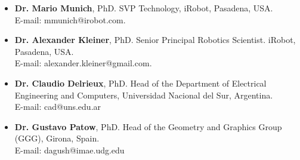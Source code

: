 \documentclass[a4paper,12pt]{article}
\begin{document}
\begin{itemize}
	\item {\bf Dr. Mario Munich}, PhD. SVP Technology, iRobot, Pasadena, USA.\\E-mail: mmunich@irobot.com. \\
	\item {\bf Dr. Alexander Kleiner}, PhD. Senior Principal Robotics Scientist. iRobot, Pasadena, USA.\\E-mail: alexander.kleiner@gmail.com. \\
	\item {\bf Dr. Claudio Delrieux}, PhD. Head of the Department of Electrical Engineering and Computers, Universidad Nacional del Sur, Argentina.\\E-mail: cad@uns.edu.ar\\
	\item {\bf Dr. Gustavo Patow}, PhD. Head of the Geometry and Graphics Group (GGG), Girona, Spain.\\E-mail: dagush@imae.udg.edu \\
\end{itemize}
\end{document}
